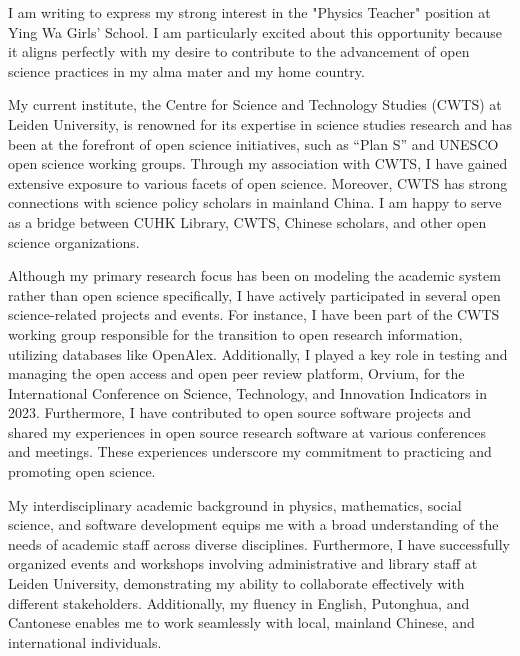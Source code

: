 \documentclass[11pt, a4paper]{awesome-cv}
\begin{document}
\makecvheader[R]

\makecvfooter
  {}%
  {}%
  {}

\makelettertitle

\begin{cvletter}

I am writing to express my strong interest in the "Physics Teacher" position at Ying Wa Girls' School. I am particularly excited about this opportunity because it aligns perfectly with my desire to contribute to the advancement of open science practices in my alma mater and my home country.

My current institute, the Centre for Science and Technology Studies (CWTS) at Leiden University, is renowned for its expertise in science studies research and has been at the forefront of open science initiatives, such as ``Plan S'' and UNESCO open science working groups. Through my association with CWTS, I have gained extensive exposure to various facets of open science. Moreover, CWTS has strong connections with science policy scholars in mainland China. I am happy to serve as a bridge between CUHK Library, CWTS, Chinese scholars, and other open science organizations.

Although my primary research focus has been on modeling the academic system rather than open science specifically, I have actively participated in several open science-related projects and events. For instance, I have been part of the CWTS working group responsible for the transition to open research information, utilizing databases like OpenAlex. Additionally, I played a key role in testing and managing the open access and open peer review platform, Orvium, for the International Conference on Science, Technology, and Innovation Indicators in 2023. Furthermore, I have contributed to open source software projects and shared my experiences in open source research software at various conferences and meetings. These experiences underscore my commitment to practicing and promoting open science.

My interdisciplinary academic background in physics, mathematics, social science, and software development equips me with a broad understanding of the needs of academic staff across diverse disciplines. Furthermore, I have successfully organized events and workshops involving administrative and library staff at Leiden University, demonstrating my ability to collaborate effectively with different stakeholders. Additionally, my fluency in English, Putonghua, and Cantonese enables me to work seamlessly with local, mainland Chinese, and international individuals.


\end{cvletter}
\end{document}
